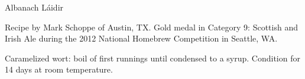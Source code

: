 \begin{recipe}{Albanach Láidir}

\begin{aboutblock}
Recipe by Mark Schoppe of Austin, TX. Gold medal in Category 9: Scottish and Irish
Ale during the 2012 National Homebrew Competition in Seattle, WA.
\sourceaha
\end{aboutblock}


\begin{methodandtiming}

\begin{mashsteps}
\end{mashsteps}

\begin{fermentationsteps}
\end{fermentationsteps}

\begin{directions}
Caramelized wort: boil  of first runnings until condensed to a syrup.
Condition for 14 days at room temperature.
\end{directions}

\end{methodandtiming}

\recipebreak

\begin{ingredientsblock}

\begin{malts}
\end{malts}

\begin{hops}
\end{hops}


\end{ingredientsblock}

\end{recipe}

